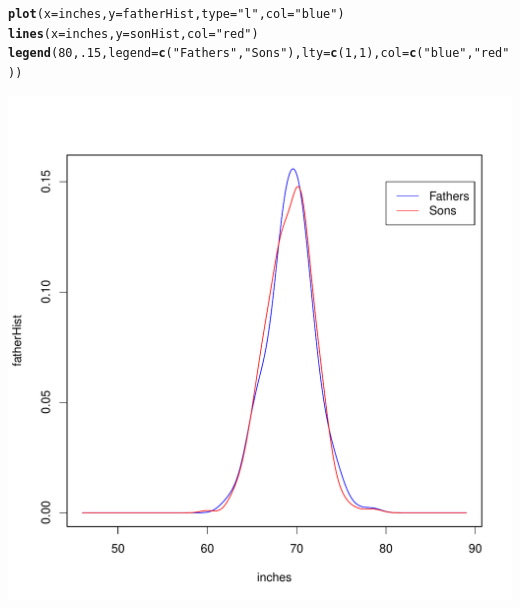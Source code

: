 \documentclass[10pt]{paper}\usepackage[]{graphicx}\usepackage[]{color}
\makeatletter
\newcommand{\hlnum}[1]{\textcolor[rgb]{0.686,0.059,0.569}{#1}}%
\newcommand{\hlstr}[1]{\textcolor[rgb]{0.192,0.494,0.8}{#1}}%
\newcommand{\hlstd}[1]{\textcolor[rgb]{0.345,0.345,0.345}{#1}}%
\newcommand{\hlkwc}[1]{\textcolor[rgb]{0.333,0.667,0.333}{#1}}%
\newcommand{\hlkwd}[1]{\textcolor[rgb]{0.737,0.353,0.396}{\textbf{#1}}}%
\newenvironment{kframe}{%
 \def\at@end@of@kframe{}%
 \ifinner\ifhmode%
  \def\at@end@of@kframe{\end{minipage}}%
  \begin{minipage}{\columnwidth}%
 \fi\fi%
 \def\FrameCommand##1{\hskip\@totalleftmargin \hskip-\fboxsep
 \colorbox{shadecolor}{##1}\hskip-\fboxsep
     \hskip-\linewidth \hskip-\@totalleftmargin \hskip\columnwidth}%
 \MakeFramed {\advance\hsize-\width
   \@totalleftmargin\z@ \linewidth\hsize
   \@setminipage}}%
 {\par\unskip\endMakeFramed%
 \at@end@of@kframe}
\newenvironment{knitrout}{}{} %
\makeatother
\begin{document}
\begin{knitrout}
\begin{kframe}
\begin{alltt}
\hlkwd{plot}\hlstd{(} \hlkwc{x}\hlstd{=inches,}\hlkwc{y}\hlstd{=fatherHist,} \hlkwc{type}\hlstd{=}\hlstr{"l"}\hlstd{,} \hlkwc{col}\hlstd{=}\hlstr{"blue"} \hlstd{)}
\hlkwd{lines}\hlstd{(}\hlkwc{x}\hlstd{=inches,}\hlkwc{y}\hlstd{=sonHist,} \hlkwc{col}\hlstd{=}\hlstr{"red"} \hlstd{)}
\hlkwd{legend}\hlstd{(} \hlnum{80}\hlstd{,}\hlnum{.15}\hlstd{,} \hlkwc{legend}\hlstd{=}\hlkwd{c}\hlstd{(}\hlstr{"Fathers"}\hlstd{,}\hlstr{"Sons"}\hlstd{),} \hlkwc{lty} \hlstd{=} \hlkwd{c}\hlstd{(}\hlnum{1}\hlstd{,}\hlnum{1}\hlstd{) ,} \hlkwc{col}\hlstd{=}\hlkwd{c}\hlstd{(}\hlstr{"blue"}\hlstd{,}\hlstr{"red"}\hlstd{))}
\end{alltt}
\end{kframe}
\includegraphics[width=6in]{figure/ThreeA-1} 

\end{knitrout}
\end{document}
